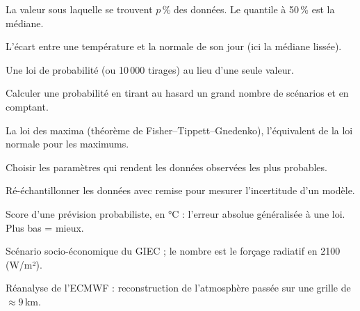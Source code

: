 \documentclass[11pt,a4paper]{article}
\begin{document}
\begin{description}[leftmargin=0pt,itemsep=3pt]
  \item[Quantile à $p$\,\%] La valeur sous laquelle se trouvent $p$\,\% des données. Le quantile à 50\,\% est la médiane.
  \item[Anomalie] L'écart entre une température et la normale de son jour (ici la médiane lissée).
  \item[Prévision probabiliste] Une loi de probabilité (ou 10\,000 tirages) au lieu d'une seule valeur.
  \item[Monte-Carlo] Calculer une probabilité en tirant au hasard un grand nombre de scénarios et en comptant.
  \item[GEV] La loi des maxima (théorème de Fisher--Tippett--Gnedenko), l'équivalent de la loi normale pour les maximums.
  \item[Maximum de vraisemblance] Choisir les paramètres qui rendent les données observées les plus probables.
  \item[Bootstrap] Ré-échantillonner les données avec remise pour mesurer l'incertitude d'un modèle.
  \item[CRPS] Score d'une prévision probabiliste, en °C : l'erreur absolue généralisée à une loi. Plus bas = mieux.
  \item[SSP] Scénario socio-économique du GIEC ; le nombre est le forçage radiatif en 2100 (W/m²).
  \item[ERA5] Réanalyse de l'ECMWF : reconstruction de l'atmosphère passée sur une grille de $\approx 9$\,km.
\end{description}
\end{document}
